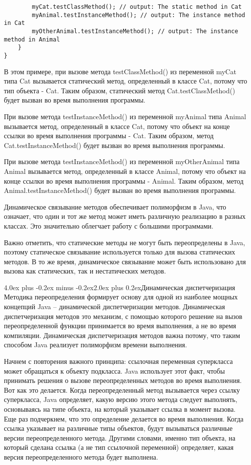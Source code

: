 \documentclass[12pt, a4paper]{book}%
\makeatletter
\renewcommand{\section}{\@startsection{section}{1}{1pt}%
{4.0ex plus -0.2ex minus -0.2ex}{2.0ex plus 0.2ex}{\centering\bf}}%
\makeatother
\begin{document}
{\begin{lstlisting}
        myCat.testClassMethod(); // output: The static method in Cat
        myAnimal.testInstanceMethod(); // output: The instance method in Cat
        myOtherAnimal.testInstanceMethod(); // output: The instance method in Animal
    }
}
\end{lstlisting}

В этом примере, при вызове метода testClassMethod() из переменной myCat типа Cat вызывается статический метод, определенный в классе Cat, потому что тип объекта - Cat. Таким образом, статический метод Cat.testClassMethod() будет вызван во время выполнения программы.

При вызове метода testInstanceMethod() из переменной myAnimal типа Animal вызывается метод, определенный в классе Cat, потому что объект на конце ссылки во время выполнения программы - Cat. Таким образом, метод Cat.testInstanceMethod() будет вызван во время выполнения программы.

При вызове метода testInstanceMethod() из переменной myOtherAnimal типа Animal вызывается метод, определенный в классе Animal, потому что объект на конце ссылки во время выполнения программы - Animal. Таким образом, метод Animal.testInstanceMethod() будет вызван во время выполнения программы.

Динамическое связывание методов обеспечивает полиморфизм в Java, что означает, что один и тот же метод может иметь различную реализацию в разных классах. Это значительно облегчает работу с большими программами.

Важно отметить, что статические методы не могут быть переопределены в Java, поэтому статическое связывание используется только для вызова статических методов. В то же время, динамическое связывание может быть использовано для вызова как статических, так и нестатических методов.

\section{Динамическая диспетчеризация}
Методика переопределения формирует основу для одной из наиболее мощных концепций Java – динамической диспетчеризации методов. Динамическая диспетчеризация методов это механизм, с помощью которого решение на вызов переопределенной функции принимается во время выполнения, а не во время компиляции. Динамическая диспетчеризация методов важна потому, что таким способом Java реализует полиморфизм времени выполнения.

Начнем с повторения важного принципа: ссылочная переменная суперкласса может обращаться к объекту подкласса. Java использует этот факт, чтобы принимать решения о вызове переопределенных методов во время выполнения. Вот как это делается. Когда переопределенный метод вызывается через ссылку суперкласса, Java определяет, какую версию этого метода следует выполнять, основываясь на типе объекта, на который указывает ссылка в момент вызова. Еще раз подчеркнем, что это определение делается во время выполнения. Когда ссылка указывает на различные типы объектов, будут вызываться различные версии переопределенного метода. Другими словами, именно тип объекта, на который сделана ссылка (а не тип ссылочной переменной) определяет, какая версия переопределенного метода будет выполнена.

}
\end{document}
